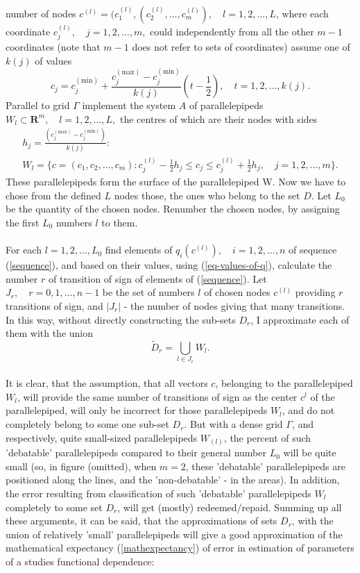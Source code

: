 number of nodes $c^{(l)} = (c_{1}^{(l)},(c_{2}^{(l)},\dots,c_{m}^{(l)}),\quad l=1,2,\dots,L$, where each coordinate $c_{j}^{(l)}, \quad j=1,2,\dots,m,$ could independently from all the other $m-1$ coordinates (note that $m-1$ does not refer to sets of coordinates) assume one of $k(j)$ of values
\begin{equation}
c_{j}=c_{j}^{(\text{min})} + \frac{c_{j}^{(\text{max})}-c_{j}^{(\text{min})}}{k(j)}(t-\frac{1}{2}), \quad t=1,2,\dots,k(j).
\end{equation}
Parallel to grid $\Gamma$ implement the system $A$ of parallelepipeds $W_{l} \subset \boldsymbol{R}^{m}, \quad l=1,2,\dots,L,$ the centres of which are their nodes with sides
\begin{gather}
h_{j} = \frac{(c_{j}^{(\text{max})}-c_{j}^{(\text{min})})}{k(j)}: \\
W_{l} = \lbrace c=(c_{1},c_{2},\dots,c_{m}):c_{j}^{(l)}-\frac{1}{2} h_{j} \leq c_{j} \leq c_{j}^{(l)}+\frac{1}{2} h_{j}, \quad j=1,2,\dots,m \rbrace .
\end{gather}
These parallelepipeds form the surface of the parallelepiped W. Now we have to chose from the defined $L$ nodes those, the ones who belong to the set $D$. Let $L_{0}$ be the quantity of the chosen nodes. Renumber the chosen nodes, by assigning the first $L_{0}$ numbers $l$ to them. \\
\\
For each $l=1,2,\dots,L_{0}$ find elements of $q_{i}(c^{(l)}), \quad i=1,2,\dots,n$ of sequence (\ref{sequence}), and based on their values, using (\ref{eq-values-of-q}), calculate the number $r$ of transition of sign of elements of (\ref{sequence}). Let $J_{r}, \quad r=0,1,\dots,n-1$ be the set of numbers $l$ of chosen nodes $c^{(l)}$ providing $r$ transitions of sign, and $|J_{r}|$ - the number of nodes giving that many transitions. In this way, without directly constructing the sub-sets $D_{r}$, I approximate each of them with the union
\begin{equation}
\tilde{D}_{r} = \bigcup_{l \in J_{r}} W_{l}.
\end{equation}
\\
It is clear, that the assumption, that all vectors $c$, belonging to the parallelepiped $W_{l}$, will provide the same number of transitions of sign as the center $c^{l}$ of the parallelepiped, will only be incorrect for those parallelepipeds $W_{l}$, and do not completely belong to some one sub-set $D_{r}$. But with a dense grid $\Gamma$, and respectively, quite small-sized parallelepipeds $W_{(l)}$, the percent of such 'debatable' parallelepipeds compared to their general number $L_{0}$ will be quite small (so, in figure (omitted), when $m=2$, these 'debatable' parallelepipeds are positioned along the lines, and the 'non-debatable' - in the areas). In addition, the error resulting from classification of such 'debatable' parallelepipeds $W_{l}$ completely to some set $D_{r}$, will get (mostly) redeemed/repaid. Summing up all these arguments, it can be said, that the approximations of sets $D_{r}$, with the union of relatively 'small' parallelepipeds will give a good  approximation of the mathematical expectancy (\ref{mathexpectancy}) of error in estimation of parameters of a studies functional dependence:
